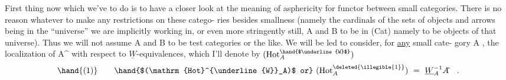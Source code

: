 First thing now which we've to do is to have a closer look at the
meaning of asphericity for  functor between  small categories.  There is
no reason whatever to  make any restrictions on these catego-%
ries besides smallness  (namely the cardinals of the sets of objects and
arrows being in the ``universe'' we are implicitly working in,  or even
more stringently still,  A and B to be in (Cat)  namely to be objects
of that universe).  Thus we will not assume A and B to be test categories
or the like.   We will be led to consider,  for \uline{any} small cate-%
gory A ,  the localization of A\^{} with respect to $\underline{W}$-equivalences,  which
I'll denote by $(\mathrm{Hot}^{\hand{$\underline{W}$}}_A)$ 
\[ \hand{(1)} \qquad \hand{$(\mathrm{Hot}^{\underline{W}}_A)$ or} \ (\mathrm{Hot}^{\deleted{\illegible{1}}}_A) \ = \ \underline{W}_A^{-1}A\hat{} \quad . \]

